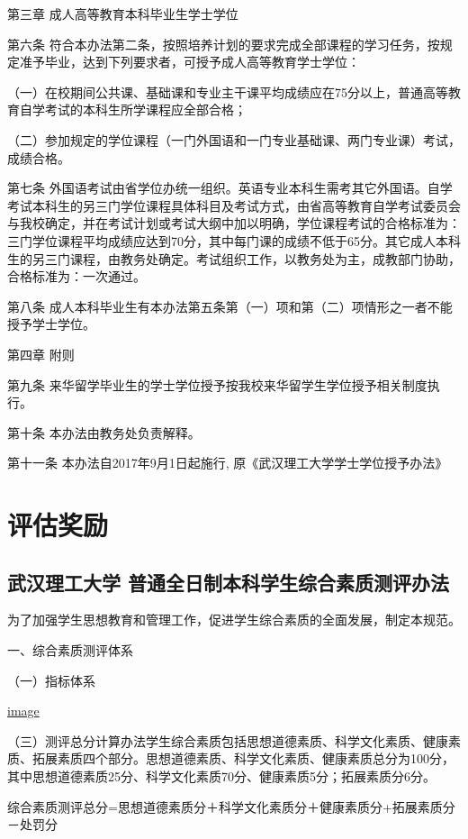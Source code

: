 \documentclass[UTF8,12pt,a4paper]{report}
\begin{document}
第三章 成人高等教育本科毕业生学士学位

第六条  符合本办法第二条，按照培养计划的要求完成全部课程的学习任务，按规定准予毕业，达到下列要求者，可授予成人高等教育学士学位：

（一）在校期间公共课、基础课和专业主干课平均成绩应在75分以上，普通高等教育自学考试的本科生所学课程应全部合格；

（二）参加规定的学位课程（一门外国语和一门专业基础课、两门专业课）考试，成绩合格。

第七条  外国语考试由省学位办统一组织。英语专业本科生需考其它外国语。自学考试本科生的另三门学位课程具体科目及考试方式，由省高等教育自学考试委员会与我校确定，并在考试计划或考试大纲中加以明确，学位课程考试的合格标准为：三门学位课程平均成绩应达到70分，其中每门课的成绩不低于65分。其它成人本科生的另三门课程，由教务处确定。考试组织工作，以教务处为主，成教部门协助，合格标准为：一次通过。

第八条  成人本科毕业生有本办法第五条第（一）项和第（二）项情形之一者不能授予学士学位。



第四章 附则

第九条  来华留学毕业生的学士学位授予按我校来华留学生学位授予相关制度执行。

第十条  本办法由教务处负责解释。

第十一条  本办法自2017年9月1日起施行, 原《武汉理工大学学士学位授予办法》

\part{评估奖励}
\chapter{武汉理工大学 普通全日制本科学生综合素质测评办法}
为了加强学生思想教育和管理工作，促进学生综合素质的全面发展，制定本规范。

一、综合素质测评体系

（一）指标体系

\href{http://img01.fs.yiban.cn/out/thumb_550x0/aHR0cDovL3lmczAxLmZzLnlpYmFuLmNuL3dlYi83NTg4OTE0L3VwbG9hZC8xNTA0NzY5Mjc4NTE2NTc3LnBuZw==}{image}

（三）测评总分计算办法学生综合素质包括思想道德素质、科学文化素质、健康素质、拓展素质四个部分。思想道德素质、科学文化素质、健康素质总分为100分，其中思想道德素质25分、科学文化素质70分、健康素质5分；拓展素质分6分。

综合素质测评总分=思想道德素质分＋科学文化素质分＋健康素质分+拓展素质分－处罚分
\end{document}
